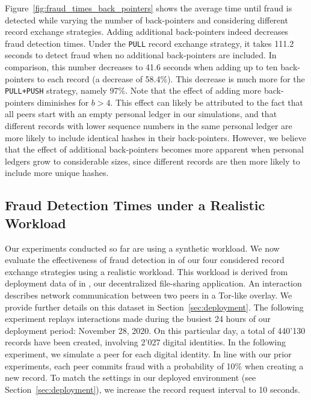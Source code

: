 Figure~\ref{fig:fraud_times_back_pointers} shows the average time until fraud is detected while varying the number of back-pointers and considering different record exchange strategies.
Adding additional back-pointers indeed decreases fraud detection times.
Under the \texttt{PULL} record exchange strategy, it takes 111.2 seconds to detect fraud when no additional back-pointers are included. In comparison, this number decreases to 41.6 seconds when adding up to ten back-pointers to each record (a decrease of 58.4\%).
This decrease is much more for the \texttt{PULL+PUSH} strategy, namely 97\%.
Note that the effect of adding more back-pointers diminishes for $ b > 4 $.
This effect can likely be attributed to the fact that all peers start with an empty personal ledger in our simulations, and that different records with lower sequence numbers in the same personal ledger are more likely to include identical hashes in their back-pointers.
However, we believe that the effect of additional back-pointers becomes more apparent when personal ledgers grow to considerable sizes, since different records are then more likely to include more unique hashes.

\subsection{Fraud Detection Times under a Realistic Workload}
\label{subsec:realistic_workload}
Our experiments conducted so far are using a synthetic workload.
We now evaluate the effectiveness of fraud detection in \TrustChain{} of our four considered record exchange strategies using a realistic workload.
This workload is derived from deployment data of \TrustChain{} in \Tribler{}, our decentralized file-sharing application.
An interaction describes network communication between two peers in a Tor-like overlay.
We provide further details on this dataset in Section~\ref{sec:deployment}.
The following experiment replays interactions made during the busiest 24 hours of our deployment period: November 28, 2020.
On this particular day, a total of 440'130 records have been created, involving 2'027 digital identities.
In the following experiment, we simulate a peer for each digital identity.
In line with our prior experiments, each peer commits fraud with a probability of 10\% when creating a new record.
To match the \TrustChain{} settings in our deployed environment (see Section~\ref{sec:deployment}), we increase the record request interval to 10 seconds.

